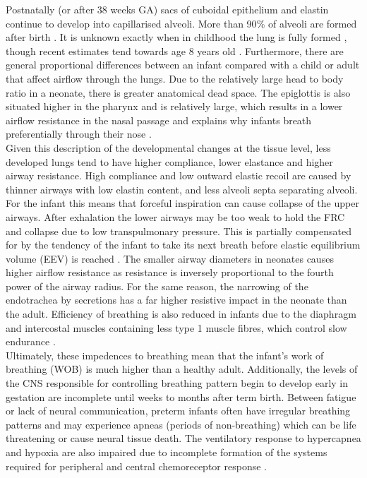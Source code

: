 \documentclass[12pt, openany, oneside]{book}
\begin{document}
Postnatally (or after 38 weeks GA) sacs of cuboidal epithelium and elastin continue to develop into capillarised alveoli. More than 90{\%} of alveoli are formed after birth \citep{smith2010normal}. It is unknown exactly when in childhood the lung is fully formed \cite{burri1984fetal}, though recent estimates tend towards age 8 years old \citep{smith2010normal}. Furthermore, there are general proportional differences between an infant compared with a child or adult that affect airflow through the lungs. Due to the relatively large head to body ratio in a neonate, there is greater anatomical dead space. The epiglottis is also situated higher in the pharynx and is relatively large, which results in a lower airflow resistance in the nasal passage and explains why infants breath preferentially through their nose \citep{neumann}.  \\

Given this description of the developmental changes at the tissue level, less developed lungs tend to have higher compliance, lower elastance and higher airway resistance. High compliance and low outward elastic recoil are caused by thinner airways with low elastin content, and less alveoli septa separating alveoli. For the infant this means that forceful inspiration can cause  collapse of the upper airways. After exhalation the lower airways may be too weak to hold the FRC and collapse due to low transpulmonary pressure. This is partially compensated for by the tendency of the infant to take its next breath before elastic equilibrium volume (EEV) is reached \citep{manual}. The smaller airway diameters in neonates causes higher airflow resistance as resistance is inversely proportional to the fourth power of the airway radius. For the same reason, the narrowing of the endotrachea by secretions has a far higher resistive impact in the neonate than the adult. Efficiency of breathing is also reduced in infants due to the diaphragm and intercostal muscles containing less type 1 muscle fibres, which control slow endurance \citep{neumann}. \\


Ultimately, these impedences to breathing mean that the infant's work of breathing (WOB) is much higher than a healthy adult.  Additionally, the levels of the CNS responsible for controlling breathing pattern begin to develop early in gestation are incomplete until weeks to months after term birth. Between fatigue or lack of neural communication, preterm infants often have irregular breathing patterns and may experience apneas (periods of non-breathing) which can be life threatening or cause neural tissue death. The ventilatory response to hypercapnea and hypoxia are also impaired due to incomplete formation of the systems required for peripheral and central chemoreceptor response \citep{neumann}. 
\end{document}
